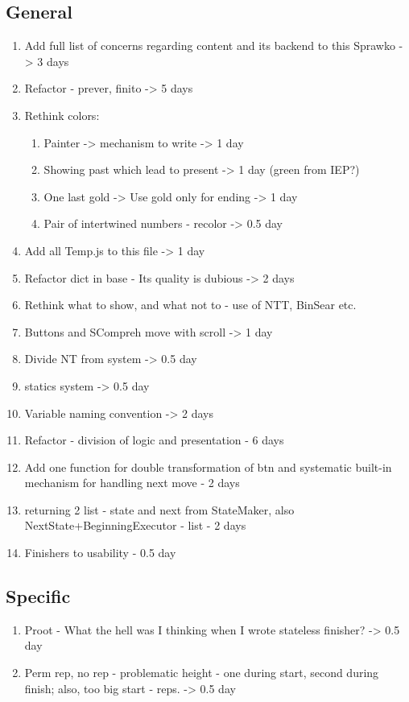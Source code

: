 \documentclass[12pt]{article}
\begin{document}
\subsection{General}
\begin {enumerate}
	\item Add full list of concerns regarding content and its backend to this Sprawko -> 3 days
	\item Refactor - prever, finito -> 5 days
	\item Rethink colors:
	\begin{enumerate}
		\item Painter -> mechanism to write -> 1 day
		\item Showing past which lead to present -> 1 day (green from IEP?)
		\item One last gold -> Use gold only for ending -> 1 day
		\item Pair of intertwined numbers - recolor -> 0.5 day
	\end{enumerate}
	\item Add all Temp.js to this file -> 1 day
	\item Refactor dict in base - Its quality is dubious -> 2 days
	\item Rethink what to show, and what not to - use of NTT, BinSear etc.
	\item Buttons and SCompreh move with scroll -> 1 day
	\item Divide NT from system -> 0.5 day
	\item statics system -> 0.5 day
	\item Variable naming convention -> 2 days
	\item Refactor - division of logic and presentation - 6 days
	\item Add one function for double transformation of btn and systematic built-in mechanism for handling next move - 2 days
	\item returning 2 list - state and next from StateMaker, also NextState+BeginningExecutor - list - 2 days 
	\item Finishers to usability - 0.5 day
\end{enumerate}
\subsection{Specific}
\begin {enumerate}
	\item Proot - What the hell was I thinking when I wrote stateless finisher? -> 0.5 day
	\item Perm rep, no rep - problematic height - one during start, second during finish; also, too big start - reps. -> 0.5 day
\end{enumerate}
\end{document}
